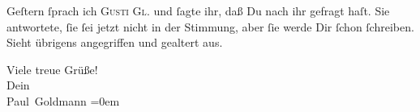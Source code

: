 \pstart
           {\pb}Geſtern ſprach ich \textsc{Gusti Gl}. und ſagte ihr, daß Du nach ihr gefragt
               haſt. Sie antwortete, ſie ſei jetzt nicht in der Stimmung, aber ſie werde Dir ſchon
               ſchreiben. Sieht übrigens angegriffen und gealtert aus.\pend
           
\pstart
           Viele treue Grüße! {\\[\baselineskip]}Dein {\\[\baselineskip]}\spacefill\mbox{Paul Goldmann}\pend
           \leftskip=0em{}\endnumbering{}  
      